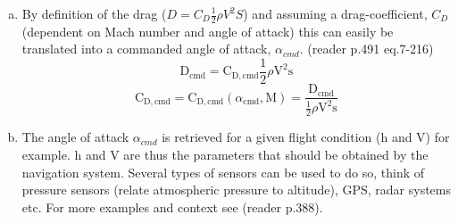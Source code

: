 \begin{enumerate}[a.]
\item
By definition of the drag ($D=C_{D} \frac{1}{2} \rho V^{2} S$) and assuming a drag-coefficient, $C_{D}$(dependent on Mach number and angle of attack) this can easily be translated into a commanded angle of attack, $\alpha_{cmd}$. (reader p.491 eq.7-216)
\begin{equation}
\mathrm{D}_{\mathrm{cmd}}=\mathrm{C}_{\mathrm{D}, \mathrm{cmd}} \frac{1}{2} \rho \mathrm{V}^{2} \mathrm{s}
\end{equation}
\begin{equation}
\mathrm{C}_{\mathrm{D}, \mathrm{cmd}}=\mathrm{C}_{\mathrm{D}, \mathrm{cmd}}\left(\alpha_{\mathrm{cmd}}, \mathrm{M}\right)=\frac{\mathrm{D}_{\mathrm{cmd}}}{\frac{1}{2} \rho \mathrm{V}^{2} \mathrm{s}}
\end{equation}

\item
The angle of attack $\alpha_{cmd}$ is retrieved for a given flight condition (h and V) for example. h and V are thus the parameters that should be obtained by the navigation system. Several types of sensors can be used to do so, think of pressure sensors (relate atmospheric pressure to altitude), GPS, radar systems etc. For more examples and context see (reader p.388).
\end{enumerate}